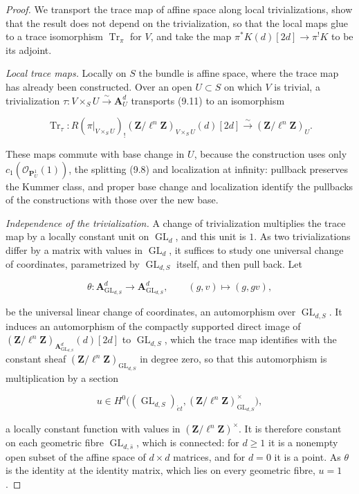 \documentclass[11pt]{article}
\providecommand{\GL}{}\renewcommand{\GL}{\operatorname{GL}}
\begin{document}
\begin{proof}[{Proof}]\label{bp20}%
We transport the trace map of affine space along local trivializations, show that the result does not depend on the trivialization, so that the local maps glue to a trace isomorphism \(\operatorname{Tr}_\pi\) for \(V\), and take the map \(\pi^*K(d)[2d]\to\pi^!K\) to be its adjoint.

\emph{Local trace maps.} Locally on \(S\) the bundle is affine space, where the trace map has already been constructed. Over an open \(U\subset S\) on which \(V\) is trivial, a trivialization \(\tau:V\times_S U\xrightarrow{\sim}\mathbf A^d_U\) transports (9.11) to an isomorphism

\[
\operatorname{Tr}_{\tau}:
R(\pi|_{V\times_S U})_!(\mathbf Z/\ell^n\mathbf Z)_{V\times_S U}(d)[2d]
\xrightarrow{\sim}(\mathbf Z/\ell^n\mathbf Z)_U.
\]

These maps commute with base change in \(U\), because the construction uses only \(c_1(\mathcal O_{\mathbf P^1_U}(1))\), the splitting (9.8) and localization at infinity: pullback preserves the Kummer class, and proper base change and localization identify the pullbacks of the constructions with those over the new base.

\emph{Independence of the trivialization.} A change of trivialization multiplies the trace map by a locally constant unit on \(\GL_d\), and this unit is \(1\). As two trivializations differ by a matrix with values in \(\GL_d\), it suffices to study one universal change of coordinates, parametrized by \(\GL_{d,S}\) itself, and then pull back. Let

\[
\theta:\mathbf A^d_{\GL_{d,S}}\longrightarrow\mathbf A^d_{\GL_{d,S}},
\qquad (g,v)\longmapsto(g,gv),
\]

be the universal linear change of coordinates, an automorphism over \(\GL_{d,S}\). It induces an automorphism of the compactly supported direct image of \((\mathbf Z/\ell^n\mathbf Z)_{\mathbf A^d_{\GL_{d,S}}}(d)[2d]\) to \(\GL_{d,S}\), which the trace map identifies with the constant sheaf \((\mathbf Z/\ell^n\mathbf Z)_{\GL_{d,S}}\) in degree zero, so that this automorphism is multiplication by a section

\[
u\in H^0\bigl((\GL_{d,S})_{\acute{e}t},
(\mathbf Z/\ell^n\mathbf Z)_{\GL_{d,S}}^{\times}\bigr),
\]

a locally constant function with values in \((\mathbf Z/\ell^n\mathbf Z)^{\times}\). It is therefore constant on each geometric fibre \(\GL_{d,\bar s}\), which is connected: for \(d\geq1\) it is a nonempty open subset of the affine space of \(d\times d\) matrices, and for \(d=0\) it is a point. As \(\theta\) is the identity at the identity matrix, which lies on every geometric fibre, \(u=1\).


\end{proof}
\end{document}
